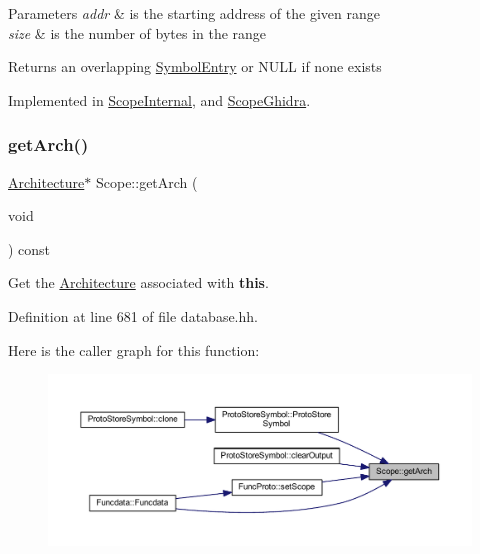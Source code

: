 \begin{DoxyParams}{Parameters}
{\em addr} & is the starting address of the given range \\
\hline
{\em size} & is the number of bytes in the range \\
\hline
\end{DoxyParams}
\begin{DoxyReturn}{Returns}
an overlapping \mbox{\hyperlink{class_symbol_entry}{Symbol\+Entry}} or N\+U\+LL if none exists 
\end{DoxyReturn}


Implemented in \mbox{\hyperlink{class_scope_internal_a3c241113085be88a74f73d2431de72f3}{Scope\+Internal}}, and \mbox{\hyperlink{class_scope_ghidra_afb59d45c8fa404fe023e054b255d5a3d}{Scope\+Ghidra}}.

\mbox{\label{class_scope_aefd7be7ee3eecb3bd59e2047f866aa60}} 
\subsubsection{\texorpdfstring{getArch()}{getArch()}}
{\footnotesize\ttfamily \mbox{\hyperlink{class_architecture}{Architecture}}$\ast$ Scope\+::get\+Arch (\begin{DoxyParamCaption}\item[{void}]{ }\end{DoxyParamCaption}) const\hspace{0.3cm}{\ttfamily [inline]}}



Get the \mbox{\hyperlink{class_architecture}{Architecture}} associated with {\bfseries{this}}. 



Definition at line 681 of file database.\+hh.

Here is the caller graph for this function\+:
\nopagebreak
\begin{figure}[H]
\begin{center}
\leavevmode
\includegraphics[width=350pt]{class_scope_aefd7be7ee3eecb3bd59e2047f866aa60_icgraph}
\end{center}
\end{figure}
\mbox{\label{class_scope_a909e15a7a96c9b402855b56b6bfdbd9f}} 
